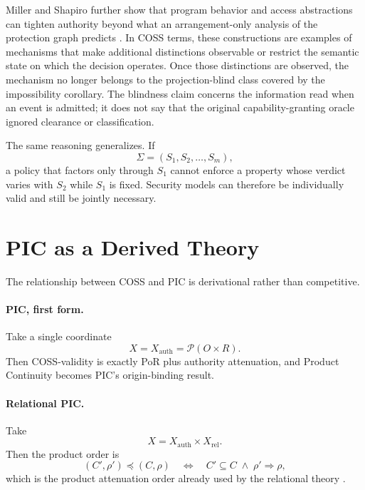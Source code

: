 \documentclass[10pt,twocolumn]{article}
\newcommand{\Model}{\textnormal{\textsc{COSS}}\xspace}
\newcommand{\powerset}{\mathcal{P}}
\newcommand{\state}{\Sigma}
\begin{document}
Miller and Shapiro further show that program behavior and access abstractions can
tighten authority beyond what an arrangement-only analysis of the protection
graph predicts \cite{miller_shapiro2003}.  In \Model terms, these constructions
are examples of mechanisms that make additional distinctions observable or
restrict the semantic state on which the decision operates.  Once those
distinctions are observed, the mechanism no longer belongs to the
projection-blind class covered by the impossibility corollary.  The blindness
claim concerns the information read when an event is admitted; it does not say
that the original capability-granting oracle ignored clearance or
classification.

The same reasoning generalizes.  If
\begin{equation}
  \state=(S_1,S_2,\ldots,S_m),
\end{equation}
a policy that factors only through $S_1$ cannot enforce a property whose
verdict varies with $S_2$ while $S_1$ is fixed.  Security models can therefore
be individually valid and still be jointly necessary.

\section{PIC as a Derived Theory}

The relationship between \Model and PIC is derivational rather than
competitive.

\paragraph{PIC, first form.}
Take a single coordinate
\begin{equation}
  X=X_{\mathrm{auth}}=\powerset(O\times R).
\end{equation}
Then \Model-validity is exactly PoR plus authority attenuation, and Product
Continuity becomes PIC's origin-binding result.

\paragraph{Relational PIC.}
Take
\begin{equation}
  X=X_{\mathrm{auth}}\times X_{\mathrm{rel}}.
\end{equation}
Then the product order is
\begin{equation}
  (C',\rho')\preceq(C,\rho)
  \quad\Longleftrightarrow\quad
  C'\subseteq C\;\land\;\rho'\Rightarrow\rho,
\end{equation}
which is the product attenuation order already used by the relational theory
\cite{gallo_relational2026}.
\end{document}

